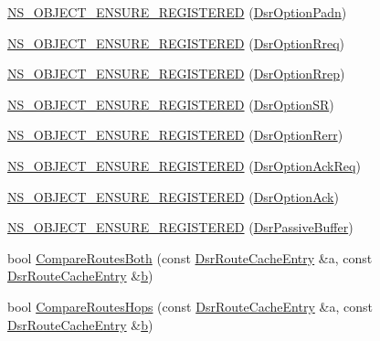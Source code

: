 \begin{DoxyCompactItemize}
\item 
\hyperlink{namespacens3_1_1dsr_aea055016900576f5f20fc223169e60fc}{N\+S\+\_\+\+O\+B\+J\+E\+C\+T\+\_\+\+E\+N\+S\+U\+R\+E\+\_\+\+R\+E\+G\+I\+S\+T\+E\+R\+ED} (\hyperlink{classns3_1_1dsr_1_1DsrOptionPadn}{Dsr\+Option\+Padn})
\item 
\hyperlink{namespacens3_1_1dsr_aa0672a0340081736a22ce0c4671f1470}{N\+S\+\_\+\+O\+B\+J\+E\+C\+T\+\_\+\+E\+N\+S\+U\+R\+E\+\_\+\+R\+E\+G\+I\+S\+T\+E\+R\+ED} (\hyperlink{classns3_1_1dsr_1_1DsrOptionRreq}{Dsr\+Option\+Rreq})
\item 
\hyperlink{namespacens3_1_1dsr_a4575f60ebce3dc92b73d1add70ac6ced}{N\+S\+\_\+\+O\+B\+J\+E\+C\+T\+\_\+\+E\+N\+S\+U\+R\+E\+\_\+\+R\+E\+G\+I\+S\+T\+E\+R\+ED} (\hyperlink{classns3_1_1dsr_1_1DsrOptionRrep}{Dsr\+Option\+Rrep})
\item 
\hyperlink{namespacens3_1_1dsr_a5f2f82105cbade2fef462e6ecd4cd54a}{N\+S\+\_\+\+O\+B\+J\+E\+C\+T\+\_\+\+E\+N\+S\+U\+R\+E\+\_\+\+R\+E\+G\+I\+S\+T\+E\+R\+ED} (\hyperlink{classns3_1_1dsr_1_1DsrOptionSR}{Dsr\+Option\+SR})
\item 
\hyperlink{namespacens3_1_1dsr_a468914875c234b96e3d47f59fcc92c81}{N\+S\+\_\+\+O\+B\+J\+E\+C\+T\+\_\+\+E\+N\+S\+U\+R\+E\+\_\+\+R\+E\+G\+I\+S\+T\+E\+R\+ED} (\hyperlink{classns3_1_1dsr_1_1DsrOptionRerr}{Dsr\+Option\+Rerr})
\item 
\hyperlink{namespacens3_1_1dsr_aab3f5eeb90707df00a8bf33605cd93da}{N\+S\+\_\+\+O\+B\+J\+E\+C\+T\+\_\+\+E\+N\+S\+U\+R\+E\+\_\+\+R\+E\+G\+I\+S\+T\+E\+R\+ED} (\hyperlink{classns3_1_1dsr_1_1DsrOptionAckReq}{Dsr\+Option\+Ack\+Req})
\item 
\hyperlink{namespacens3_1_1dsr_abd02085539a3b51a6e0e236b694ac560}{N\+S\+\_\+\+O\+B\+J\+E\+C\+T\+\_\+\+E\+N\+S\+U\+R\+E\+\_\+\+R\+E\+G\+I\+S\+T\+E\+R\+ED} (\hyperlink{classns3_1_1dsr_1_1DsrOptionAck}{Dsr\+Option\+Ack})
\item 
\hyperlink{namespacens3_1_1dsr_ae9d49d975bfe6ab0713b710c95be830c}{N\+S\+\_\+\+O\+B\+J\+E\+C\+T\+\_\+\+E\+N\+S\+U\+R\+E\+\_\+\+R\+E\+G\+I\+S\+T\+E\+R\+ED} (\hyperlink{classns3_1_1dsr_1_1DsrPassiveBuffer}{Dsr\+Passive\+Buffer})
\item 
bool \hyperlink{namespacens3_1_1dsr_a37d4c01f63b6c1edb67cb5c5ce16ad25}{Compare\+Routes\+Both} (const \hyperlink{classns3_1_1dsr_1_1DsrRouteCacheEntry}{Dsr\+Route\+Cache\+Entry} \&a, const \hyperlink{classns3_1_1dsr_1_1DsrRouteCacheEntry}{Dsr\+Route\+Cache\+Entry} \&\hyperlink{lte__pathloss_8m_a21ad0bd836b90d08f4cf640b4c298e7c}{b})
\item 
bool \hyperlink{namespacens3_1_1dsr_a97e8ae60f143c7591cb09f96761ad1ea}{Compare\+Routes\+Hops} (const \hyperlink{classns3_1_1dsr_1_1DsrRouteCacheEntry}{Dsr\+Route\+Cache\+Entry} \&a, const \hyperlink{classns3_1_1dsr_1_1DsrRouteCacheEntry}{Dsr\+Route\+Cache\+Entry} \&\hyperlink{lte__pathloss_8m_a21ad0bd836b90d08f4cf640b4c298e7c}{b})

\end{DoxyCompactItemize}
